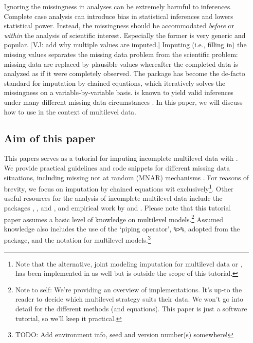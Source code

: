 \documentclass[
]{jss}
\begin{document}
Ignoring the missingness in analyses can be extremely harmful to
inferences. Complete case analysis can introduce bias in statistical
inferences and lowers statistical power. Instead, the missingness should
be accommodated \emph{before} or \emph{within} the analysis of
scientific interest. Especially the former is very generic and popular.
{[}VJ: add why multiple values are imputed.{]} Imputing (i.e., filling
in) the missing values separates the missing data problem from the
scientific problem: missing data are replaced by plausible values
whereafter the completed data is analyzed as if it were completely
observed. The  package  has become the de-facto
standard for imputation by chained equations, which iteratively solves
the missingness on a variable-by-variable basis.  is known to
yield valid inferences under many different missing data circumstances
\citep{buur18}. In this paper, we will discuss how to use  in
the context of multilevel data.

\hypertarget{aim-of-this-paper}{%
\subsection{Aim of this paper}\label{aim-of-this-paper}}

This papers serves as a tutorial for imputing incomplete multilevel data
with . We provide practical guidelines and code snippets for
different missing data situations, including missing not at random
(MNAR) mechanisms \citep[where the probability to be missing depends on
unrecorded information, making the missingness
non-ignorable,][]{rubi76, meng94}. For reasons of brevity, we focus on
imputation by chained equations wit  exclusively\footnote{Note
  that the alternative, joint modeling imputation for multilevel data or
   \citet{jomo}, has been implemented in  as well
  but is outside the scope of this tutorial.}. Other useful resources
for the analysis of incomplete multilevel data include the 
packages , , and , and empirical work
by \citet{audi18} and \citet{grun18}. Please note that this tutorial
paper assumes a basic level of knowledge on multilevel
models.\footnote{Note to self: We're providing an overview of
  implementations. It's up-to the reader to decide which multilevel
  strategy suits their data. We won't go into detail for the different
  methods (and equations). This paper is just a software tutorial, so
  we'll keep it practical.} Assumed knowledge also includes the use of
the `piping operator', \texttt{\%\textgreater{}\%}, adopted from the
 package, and the  notation for multilevel
models.\footnote{TODO: Add environment info, seed and version number(s)
  somewhere!}
\end{document}
